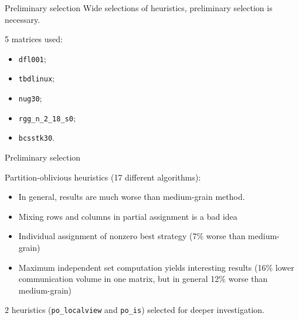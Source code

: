 \begin{frame}{Preliminary selection}
	Wide selections of heuristics, preliminary selection is necessary.

	5 matrices used: 

	\begin{itemize}
		\item \texttt{dfl001};
		\item \texttt{tbdlinux};
		\item \texttt{nug30};
		\item \texttt{rgg\_n\_2\_18\_s0};
		\item  \texttt{bcsstk30}. 
	\end{itemize}

\end{frame}

\begin{frame}{Preliminary selection}

	Partition-oblivious heuristics (17 different algorithms):

	\begin{itemize}
		\item In general, results are much worse than medium-grain method.
		\item Mixing rows and columns in partial assignment is a bad idea
		\item Individual assignment of nonzero best strategy (7\% worse than medium-grain)
		\item Maximum independent set computation yields interesting results (16\% lower communication volume in one matrix, but in general 12\% worse than medium-grain)
	\end{itemize}

	2 heuristics (\texttt{po\_localview} and \texttt{po\_is}) selected for deeper investigation.

\end{frame}

